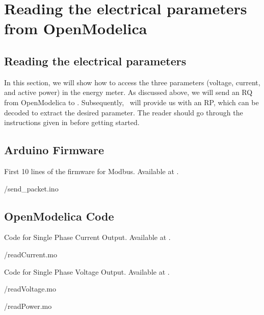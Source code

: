 \section{Reading the electrical parameters from OpenModelica}
\subsection{Reading the electrical parameters}
In this section, we will show how to access the three parameters (voltage, current, and active power) in the energy meter. As discussed above, we will send an RQ from OpenModelica to \arduino. Subsequently, \arduino\ will provide us with an RP, which can be decoded to extract the desired parameter. The reader should go through the instructions given in  before getting started.

\subsection{Arduino Firmware}
\label{sec:firmware-modbus}
\begin{ardcode}
    {First 10 lines of the firmware for Modbus.  Available at
        .}
    \label{ard:firmware-modbus}
    
    {\LocMODardcode/send_packet.ino}
\end{ardcode}

\subsection{OpenModelica Code}
\label{sec:modbus-OpenModelica-code}

\begin{OpenModelicacode}
    {Code for Single Phase Current Output.
        Available at .}
    \label{OpenModelica:current-modbus}
    
    {\LocMODOpenModelicacode/readCurrent.mo}
\end{OpenModelicacode}

\begin{OpenModelicacode}
    {Code for Single Phase Voltage Output.
        Available at .}
    \label{OpenModelica:voltage-modbus}
    
    {\LocMODOpenModelicacode/readVoltage.mo}
\end{OpenModelicacode}

\begin{OpenModelicacode}
    \label{OpenModelica:modbus-power}
    
    {\LocMODOpenModelicacode/readPower.mo}
\end{OpenModelicacode}
